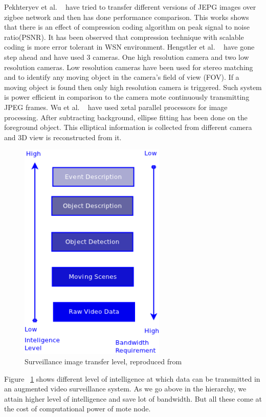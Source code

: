 \indent Pekhteryev et al. ~\cite{2} have tried to transfer different
versions of JEPG images over zigbee network and then has done
performance comparison.  This works shows that there is an effect of
compression coding algorithm on peak signal to noise ratio(PSNR). It has
been observed that compression technique with scalable coding is more
error tolerant in WSN environment. Hengstler et al. ~\cite{3, 5} have
gone step ahead and have used 3 cameras. One high resolution camera and
two low resolution cameras. Low resolution cameras have been used for
stereo matching and to identify any moving object in the camera's field
of view (FOV). If a moving object is found then only high resolution
camera is triggered. Such system is power efficient in  comparison to
the camera mote continuously transmitting JPEG frames. Wu et al.
~\cite{4} have used xetal parallel processors for image processing.
After subtracting background, ellipse fitting has been done on the
foreground object. This elliptical information is collected from
different camera and 3D view is reconstructed from it.\\

\pagebreak

\begin{figure}[!t]
\centering
\includegraphics[height=300pt]{Figures/image_tr_level}
\caption{Surveillance image transfer level, reproduced from ~\cite{3}}
\label{image_tr_level}
\end{figure}

\indent Figure ~\ref{image_tr_level} shows different level of
intelligence at which data can be transmitted in an augmented video
surveillance system. As we go above in the hierarchy, we attain higher
level of intelligence and save lot of bandwidth. But all these come at
the cost of computational power of mote node.\\

